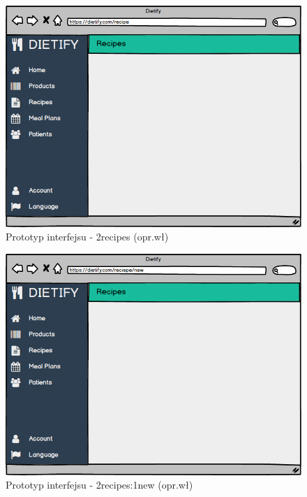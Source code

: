 \begin{minipage}{\textwidth}
    \begin{figure}[H]
        \centering\includegraphics[scale=0.55]{../mockup/2recipes.png}
        \caption{Prototyp interfejsu - 2recipes (opr.wł)}\label{rysunek:2recipes}
    \end{figure}
\end{minipage}
\begin{minipage}{\textwidth}
    \begin{figure}[H]
        \centering\includegraphics[scale=0.55]{../mockup/2recipes_1new.png}
        \caption{Prototyp interfejsu - 2recipes:1new (opr.wł)}\label{rysunek:2recipes_1new}
    \end{figure}
\end{minipage}
